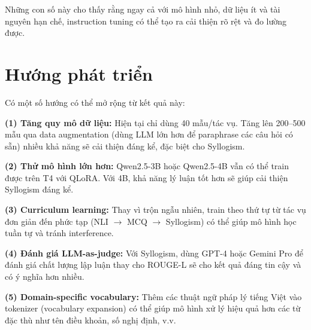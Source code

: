 \documentclass[fontsize=13pt,a4paper,oneside,DIV=calc,chapterprefix=true]{scrbook}
\begin{document}
Những con số này cho thấy rằng ngay cả với mô hình nhỏ, dữ liệu ít và tài nguyên hạn chế,
instruction tuning có thể tạo ra cải thiện rõ rệt và đo lường được.

\section*{Hướng phát triển}

Có một số hướng có thể mở rộng từ kết quả này:

\textbf{(1) Tăng quy mô dữ liệu:} Hiện tại chỉ dùng 40 mẫu/tác vụ. Tăng lên 200--500 mẫu
qua data augmentation (dùng LLM lớn hơn để paraphrase các câu hỏi có sẵn) nhiều khả năng
sẽ cải thiện đáng kể, đặc biệt cho Syllogism.

\textbf{(2) Thử mô hình lớn hơn:} Qwen2.5-3B hoặc Qwen2.5-4B vẫn có thể train được trên T4
với QLoRA. Với 4B, khả năng lý luận tốt hơn sẽ giúp cải thiện Syllogism đáng kể.

\textbf{(3) Curriculum learning:} Thay vì trộn ngẫu nhiên, train theo thứ tự từ tác vụ đơn
giản đến phức tạp (NLI $\to$ MCQ $\to$ Syllogism) có thể giúp mô hình học tuần tự và
tránh interference.

\textbf{(4) Đánh giá LLM-as-judge:} Với Syllogism, dùng GPT-4 hoặc Gemini Pro để đánh giá
chất lượng lập luận thay cho ROUGE-L sẽ cho kết quả đáng tin cậy và có ý nghĩa hơn nhiều.

\textbf{(5) Domain-specific vocabulary:} Thêm các thuật ngữ pháp lý tiếng Việt vào tokenizer
(vocabulary expansion) có thể giúp mô hình xử lý hiệu quả hơn các từ đặc thù như tên điều
khoản, số nghị định, v.v.
\end{document}
